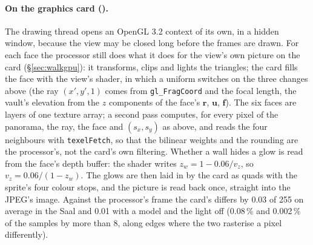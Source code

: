\paragraph{On the graphics card ().} The drawing thread opens an OpenGL 3.2 context of its own, in a
hidden window, because the view may be closed long before the frames are drawn. For each face the processor still
does what it does for the view's own picture on the card (\S\ref{sec:walkgpu}): it transforms, clips and lights the
triangles; the card fills the face with the view's shader, in which a uniform switches on the three changes above
(the ray $(x', y', 1)$ comes from \texttt{gl\_FragCoord} and the focal length, the vault's elevation from the $z$
components of the face's $\mathbf r$, $\mathbf u$, $\mathbf f$). The six faces are layers of one texture array; a
second pass computes, for every pixel of the panorama, the ray, the face and $(s_x, s_y)$ as above, and reads the
four neighbours with \texttt{texelFetch}, so that the bilinear weights and the rounding are the processor's, not the
card's own filtering. Whether a wall hides a glow is read from the face's depth buffer: the shader writes
$z_w = 1 - 0.06/v_z$, so $v_z = 0.06/(1 - z_w)$. The glows are then laid in by the card as quads with the
sprite's four colour stops, and the picture is read back once, straight into the JPEG's image. Against the
processor's frame the card's differs by 0.03 of 255 on average in the Saal and 0.01 with a model and the light
off (0.08\,\% and 0.002\,\% of the samples by more than 8, along edges where the two rasterise a pixel
differently).

